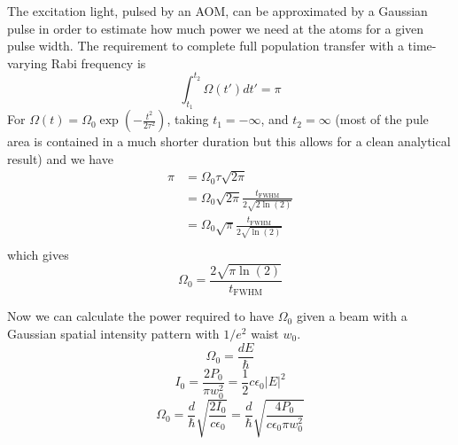 The excitation light, pulsed by an AOM, can be approximated by a Gaussian pulse in order to estimate how much power we need at the atoms for a given pulse width. The requirement to complete full population transfer with a time-varying Rabi frequency is 
\begin{equation}
\int_{t_1}^{t_2} \Omega(t') dt' =\pi
\end{equation}
For $\Omega(t)=\Omega_0 \exp({-\frac{t^2}{2\tau^2}})$, taking $t_1=-\infty$, and $t_2=\infty$ (most of the pule area is contained in a much shorter duration but this allows for a clean analytical result) and we have
\begin{equation} \label{eq:pi}
\begin{split}
\pi & = \Omega_0 \tau \sqrt{2 \pi} \\
 & = \Omega_0 \sqrt{2 \pi} \frac{t_{\textrm{FWHM}}}{2\sqrt{2\ln(2)}} \\
 & = \Omega_0 \sqrt{\pi} \frac{t_{\textrm{FWHM}}}{2\sqrt{\ln(2)}} \\
\end{split}
\end{equation}
which gives
\begin{equation}
    \Omega_0=\frac{2\sqrt{\pi \ln(2)}}{t_{\textrm{FWHM}}}
\end{equation}


Now we can calculate the power required to have $\Omega_0$ given a beam with a Gaussian spatial intensity pattern with $1/e^2$ waist $w_0$. 
\begin{equation}
    \Omega_0=\frac{dE}{\hbar}
\end{equation}
\begin{equation}
    I_0=\frac{2P_0}{\pi w_0^2}=\frac{1}{2}c \epsilon_0|E|^2
\end{equation}
\begin{equation}
    \Omega_0 =\frac{d}{\hbar}\sqrt{\frac{2I_0}
{c\epsilon_0}}=\frac{d}{\hbar}\sqrt{\frac{4P_0}{c\epsilon_0 \pi w_0^2}}
\end{equation}

